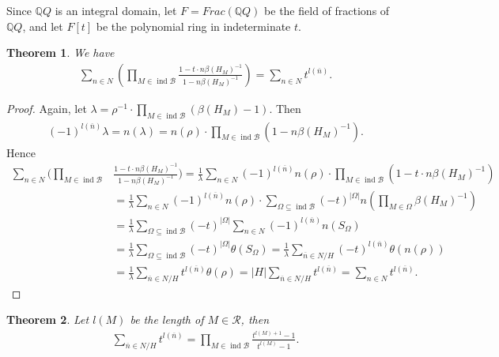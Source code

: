 \documentclass[12pt]{amsart}
\newtheorem{theorem}{Theorem}[section]
\begin{document}
Since $\mathbb{Q}Q$ is an integral domain, let $F=Frac(\mathbb{Q}Q)$ be the field of fractions of $\mathbb{Q}Q$, and let $F[t]$ be the polynomial ring in indeterminate $t$.

\begin{theorem}\label{Macdonald}
    We have 
    \begin{align*}
        \sum_{n\in N} ( \prod_{M\in \operatorname{ind}\mathcal{B}} \frac{1-t\cdot n\beta(H_M)^{-1}}{1-n\beta(H_M)^{-1}}    ) = \sum_{n\in N} t^{l(\overline{n})}.
    \end{align*}
\end{theorem}
    
\begin{proof}
    Again, let $\lambda = \rho^{-1} \cdot \prod_{M\in \operatorname{ind}\mathcal{B}}(\beta(H_M)-1)$.
    Then 
    \begin{align*}
        (-1)^{l(\overline{n})} \lambda = n(\lambda) = n(\rho)\cdot \prod_{M\in \operatorname{ind}\mathcal{B}}( 1-n\beta(H_M)^{-1}  ).
    \end{align*}
    Hence
    \begin{align*}
        \sum_{n\in N} ( \prod_{M\in \operatorname{ind}\mathcal{B}} &\frac{1-t\cdot n\beta(H_M)^{-1}}{1-n\beta(H_M)^{-1}}   ) = \frac{1}{\lambda} \sum_{n\in N} (-1)^{l(\overline{n})} n(\rho) \cdot \prod_{M\in \operatorname{ind}\mathcal{B}} (1-t\cdot n\beta(H_M)^{-1}) \\
          &=\frac{1}{\lambda} \sum_{n\in N} (-1)^{l(\overline{n})} n(\rho) \cdot \sum_{\Omega \subseteq \operatorname{ind}\mathcal{B}} (-t)^{|\Omega|} n(\prod_{M\in \Omega}\beta(H_M)^{-1})\\
          &=\frac{1}{\lambda} \sum_{\Omega \subseteq \operatorname{ind}\mathcal{B}} (-t)^{|\Omega|} \sum_{n\in N} (-1)^{l(\overline{n})} n(S_{\Omega}) \\
          &=\frac{1}{\lambda} \sum_{\Omega \subseteq \operatorname{ind}\mathcal{B}} (-t)^{|\Omega|} \theta(S_{\Omega}) =\frac{1}{\lambda} \sum_{\overline{n}\in N/H} (-t)^{l(\overline{n})} \theta(n(\rho)) \\
          &= \frac{1}{\lambda} \sum_{\overline{n}\in N/H} t^{l(\overline{n})} \theta(\rho) =|H|\sum_{\overline{n}\in N/H} t^{l(\overline{n})} =\sum_{n\in N} t^{l(\overline{n})}. 
    \end{align*}
\end{proof}

\begin{theorem}
    Let $l(M)$ be the length of $M \in \mathcal{R}$, then 
    \begin{align*}
        \sum_{\overline{n}\in N/H} t^{l(\overline{n})} = \prod_{M\in \operatorname{ind}\mathcal{B}} \frac{t^{l(M)+1}-1}{t^{l(M)}-1}.
    \end{align*}
\end{theorem}
\end{document}
